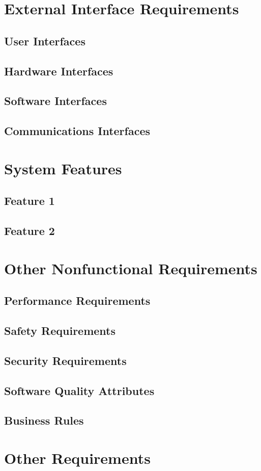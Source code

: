 \documentclass[a4paper,12pt]{article}
\begin{document}
\section{External Interface Requirements}
\subsection{User Interfaces}
\subsection{Hardware Interfaces}
\subsection{Software Interfaces}
\subsection{Communications Interfaces}
\newpage
\section{System Features}
\subsection{Feature 1}
\subsection{Feature 2}
\section{Other Nonfunctional Requirements}
\subsection{Performance Requirements}
\subsection{Safety Requirements}
\subsection{Security Requirements}
\subsection{Software Quality Attributes}
\subsection{Business Rules}
\newpage
\section{Other Requirements}
\end{document}
